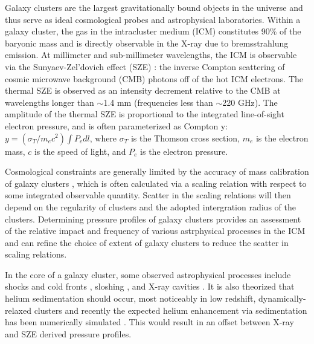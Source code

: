 \documentclass[iop,numberedappendix,apj]{emulateapj}
\begin{document}
Galaxy clusters are the largest gravitationally bound objects in the universe and thus serve as ideal cosmological probes 
and astrophysical laboratories. Within a galaxy cluster, the gas in the intracluster medium (ICM) constitutes 90\% of the
baryonic mass \citep{vikhlinin2006b} and is directly observable in the X-ray due to bremsstrahlung emission. 
At millimeter and sub-millimeter wavelengths, the ICM is observable via the Sunyaev-Zel'dovich effect (SZE) 
\citep{sunyaev1972}: the inverse Compton scattering of cosmic microwave background (CMB) photons off of
the hot ICM electrons. The thermal SZE is observed as an intensity decrement relative to the CMB at wavelengths longer 
than $\sim$1.4 mm (frequencies less than $\sim$220 GHz). The amplitude of the thermal SZE is proportional to the integrated
line-of-sight electron pressure, and is often parameterized as Compton y: $y = (\sigma_T / m_e c^2) \int P_e dl$, where
$\sigma_T$ is the Thomson cross section, $m_e$ is the electron mass, $c$ is the speed of light, and $P_e$ is the electron
pressure.

Cosmological constraints are generally limited by the accuracy of mass calibration of galaxy clusters 
\citep[e.g.][]{hasselfield2013, reichardt2013}, which is often calculated via a scaling relation with respect to some 
integrated observable quantity. Scatter in the scaling relations will then depend on the regularity of
clusters and the adopted intergration radius of the clusters. 
Determining pressure profiles of galaxy clusters provides an assessment of 
the relative impact and frequency of various astrphysical processes in the ICM and can refine the choice of extent of 
galaxy clusters to reduce the scatter in scaling relations.

In the core of a galaxy cluster, some observed astrophysical processes include shocks and cold fronts 
\citep[e.g.][]{markevitch2007}, sloshing \citep[e.g.][]{fabian2006}, and X-ray cavities \citep{mcnamara2007}. 
It is also theorized that helium sedimentation should occur, most noticeably in low redshift, dynamically-relaxed 
clusters \citep{abramopoulos1981, gilfanov1984} 
and recently the expected helium enhancement via sedimentation has been numerically simulated \citep{peng2009}. 
This would result in an offset between X-ray and SZE derived pressure profiles.
\end{document}

